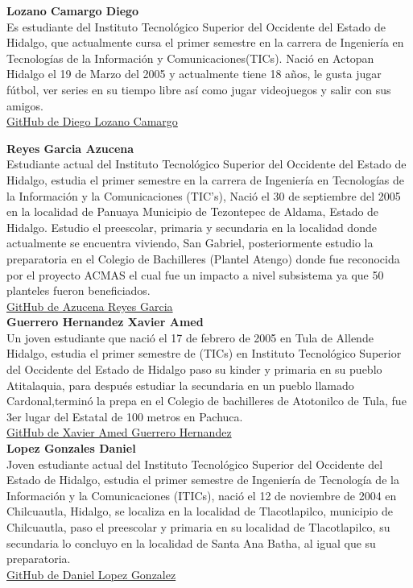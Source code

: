 \documentclass[conference]{IEEEtran}
\begin{document}
\textbf{Lozano Camargo Diego} \\
Es estudiante del Instituto Tecnológico Superior del Occidente del Estado de Hidalgo, que actualmente cursa el primer semestre en la carrera de Ingeniería en Tecnologías de la Información y Comunicaciones(TICs). Nació en Actopan Hidalgo el 19 de Marzo del 2005 y actualmente tiene 18 años, le gusta jugar fútbol, ver series en su tiempo libre así como jugar videojuegos y salir con sus amigos. \\
\href{https://github.com/diego2334577}{GitHub de Diego Lozano Camargo}

\textbf{Reyes Garcia Azucena} \\
Estudiante actual del Instituto Tecnológico Superior del Occidente del Estado de Hidalgo, estudia el primer semestre en la carrera de Ingeniería  en Tecnologías de la Información y la Comunicaciones (TIC's), Nació el 30 de septiembre del 2005 en la localidad de Panuaya  Municipio de Tezontepec de Aldama, Estado de Hidalgo. Estudio el preescolar, primaria y secundaria en la localidad donde actualmente se encuentra viviendo, San Gabriel, posteriormente estudio la preparatoria en el Colegio de Bachilleres (Plantel Atengo) donde fue reconocida por el proyecto ACMAS el cual fue un impacto a nivel subsistema ya que 50 planteles fueron beneficiados. \\
\href{https://github.com/AzucenaReyesGarcia}{GitHub de Azucena Reyes Garcia}\\

\textbf{Guerrero Hernandez Xavier Amed} \\
Un joven estudiante que nació el 17 de febrero de 2005 en Tula de Allende Hidalgo, estudia el primer semestre de (TICs) en Instituto Tecnológico Superior del Occidente del Estado de Hidalgo paso su kinder y primaria en su pueblo Atitalaquia, para después estudiar la secundaria en un pueblo llamado Cardonal,terminó la prepa en el Colegio de bachilleres de Atotonilco de Tula, fue 3er lugar del Estatal de 100 metros en Pachuca. \\
\href{https://github.com/XavierGuerreroo}{GitHub de Xavier Amed Guerrero Hernandez} \\

\textbf{Lopez Gonzales Daniel} \\
Joven estudiante actual del Instituto Tecnológico Superior del Occidente del Estado de Hidalgo, estudia el primer semestre de Ingeniería de Tecnología de la Información y la Comunicaciones (ITICs), nació el 12 de noviembre de 2004 en Chilcuautla, Hidalgo, se localiza en la localidad de Tlacotlapilco, municipio de Chilcuautla, paso el preescolar y primaria en su localidad de Tlacotlapilco, su secundaria lo concluyo en la localidad de Santa Ana Batha, al igual que su preparatoria. \\
\href{https://github.com/LopezDanielgod}{GitHub de Daniel Lopez Gonzalez}\\
\end{document}
